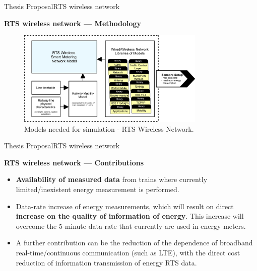 \begin{frame}{Thesis Proposal}{RTS wireless network}
\begin{block}{\textbf{RTS wireless network --- Methodology}}

\begin{figure}[ht!]
	\centering
	\includegraphics[width=0.8\textwidth,keepaspectratio]{figures/40.Method/methodWireless}
	\caption{Models needed for simulation - RTS Wireless Network.}
\end{figure}

\end{block}
\end{frame}

\begin{frame}{Thesis Proposal}{RTS wireless network}
\begin{block}{\textbf{RTS wireless network --- Contributions}}
\begin{itemize}
\item \textbf{Availability of measured data} from trains where currently limited/inexistent energy measurement is performed.

\item Data-rate increase of energy measurements, which will result on direct \textbf{increase on the quality of information of energy}. This increase will overcome the 5-minute data-rate that currently are used in energy meters.

\item A further contribution can be the reduction of the dependence of broadband real-time/continuous communication (such as \ac{LTE}), with the direct cost reduction of information transmission of energy \ac{RTS} data.
\end{itemize}
\end{block}
\end{frame}


